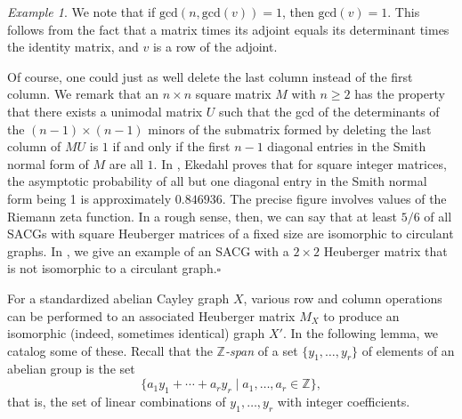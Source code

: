\documentclass{article}
\theoremstyle{definition}
\theoremstyle{remark}
\newtheorem{Ex}[Thm]{Example}
\begin{document}
\begin{Ex}
We note that if $\text{gcd}(n,\text{gcd}(v))=1$, then $\text{gcd}(v)=1$.  This follows from the fact that a matrix times its adjoint equals its determinant times the identity matrix, and $v$ is a row of the adjoint.

Of course, one could just as well delete the last column instead of the first column.  We remark that an $n\times n$ square matrix $M$ with $n\geq 2$ has the property that there exists a unimodal matrix $U$ such that the gcd of the determinants of the $(n-1)\times (n-1)$ minors of the submatrix formed by deleting the last column of $MU$ is $1$ if and only if the first $n-1$ diagonal entries in the Smith normal form of $M$ are all $1$.  In \cite{Ekedahl}, Ekedahl proves that for square integer matrices, the asymptotic probability of all but one diagonal entry in the Smith normal form being 1 is approximately $0.846936$.  The precise figure involves values of the Riemann zeta function.  In a rough sense, then, we can say that at least $5/6$ of all SACGs with square Heuberger matrices of a fixed size are isomorphic to circulant graphs.  In \cite{Cervantes-Krebs-small-cases}, we give an example of an SACG with a $2\times 2$ Heuberger matrix that is not isomorphic to a circulant graph.\hfill$\square$
\end{Ex}

For a standardized abelian Cayley graph $X$, various row and column operations can be performed to an associated Heuberger matrix $M_X$ to produce an isomorphic (indeed, sometimes identical) graph $X'.$  In the following lemma, we catalog some of these.  Recall that the \emph{$\mathbb{Z}$-span} of a set $\{y_1,\dots,y_r\}$ of elements of an abelian group is the set $$\{a_1y_1+\cdots+a_ry_r\;|\;a_1,\dots,a_r\in\mathbb{Z}\},$$ that is, the set of linear combinations of $y_1,\dots,y_r$ with integer coefficients.
\end{document}
